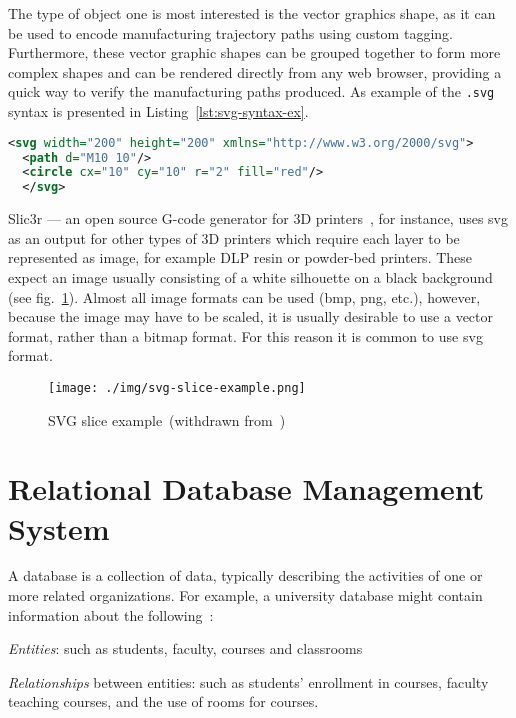 The type of object one is most interested is the vector graphics shape, as it
can be used to encode manufacturing trajectory paths using custom tagging. Furthermore, these vector
graphic shapes can be grouped together to form more complex shapes and can be
rendered directly from any web browser, providing a quick way to verify the
manufacturing paths produced. As example of the \texttt{.svg} syntax is
presented in Listing~\ref{lst:svg-syntax-ex}.

\begin{lstlisting}[language=xml, caption=SVG syntax example, label=lst:svg-syntax-ex]
<svg width="200" height="200" xmlns="http://www.w3.org/2000/svg">
  <path d="M10 10"/>
  <circle cx="10" cy="10" r="2" fill="red"/>
  </svg>
\end{lstlisting}

Slic3r --- an open source G-code generator for 3D printers~\cite{Slic3r}, for
instance, uses \gls{svg} as an output for other types of 3D printers which
require each layer to be represented as image, for example DLP resin or
powder-bed printers.
These expect an image usually consisting of a white silhouette on a
black background (see fig.~\ref{fig:svg-slice-example}). Almost all image formats can be used (bmp, png, etc.), however, because the image may have to be scaled, it is usually desirable to use a vector format, rather than a bitmap format. For this reason it is common to use \gls{svg} format.
\begin{figure}[!hbt]
  \centering
    \texttt{[image: ./img/svg-slice-example.png]}%
    \caption[SVG slice example]{SVG slice example~(withdrawn from~\cite{slic3rSvg})\footnotemark}%
    \label{fig:svg-slice-example}
\end{figure}
%


%
\section{Relational Database Management System}%
\label{sec:rdbms}
A database is a collection of data, typically describing the activities of one
or more related organizations. For example, a university database might contain
information about the following~\cite{ramakrishnan2003database}:
\begin{item-c}
\item \emph{Entities}: such as students, faculty, courses and classrooms
\item \emph{Relationships} between entities: such as students' enrollment in
  courses, faculty teaching courses, and the use of rooms for courses.
\end{item-c}


